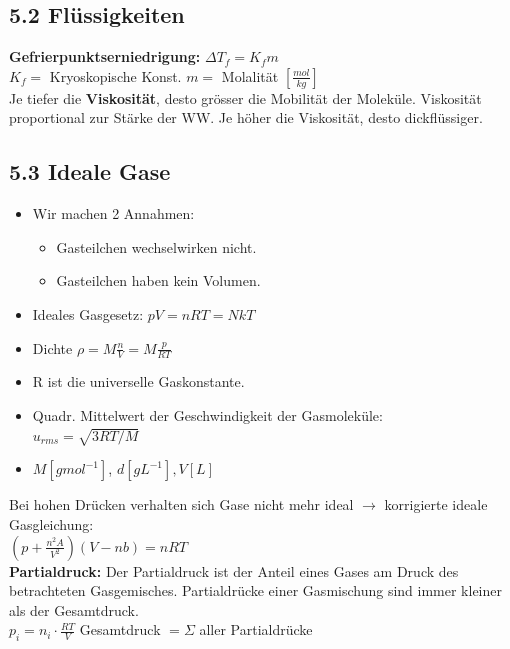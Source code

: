 \begin{multicols*}{4}
\subsection{5.2 Flüssigkeiten}{
    \textbf{Gefrierpunktserniedrigung: } $\Delta T_f=K_fm$\\
    $K_f=$ Kryoskopische Konst.     $m=$ Molalität $\left[\frac{mol}{kg}\right]$\\
    Je tiefer die \textbf{Viskosität}, desto grösser die Mobilität der Moleküle. Viskosität proportional
    zur Stärke der WW. Je höher die Viskosität, desto dickflüssiger. 
}

\cb
\subsection{5.3 Ideale Gase}{
    \begin{itemize}[noitemsep, leftmargin=*]
        \item Wir machen 2 Annahmen:
        \begin{itemize}[noitemsep, leftmargin=*]
            \item Gasteilchen wechselwirken nicht.
            \item Gasteilchen haben kein Volumen.
        \end{itemize}
        \item Ideales Gasgesetz: $pV = nRT=N kT$
        \item Dichte $\rho = M\frac{n}{V}=M\frac{p}{RT}$
        \item R ist die universelle Gaskonstante.\vspace*{1mm}
        \item Quadr. Mittelwert der Geschwindigkeit der Gasmoleküle:\\ $u_{rms}=\sqrt{3RT/M}$
        \item $M\left[ gmol^{-1} \right]$, $d\left[ gL^{-1} \right], V\left[L\right]$
    \end{itemize}
    \vspace{1mm}
    Bei hohen Drücken verhalten sich Gase nicht mehr ideal $\rightarrow$  korrigierte
    ideale Gasgleichung:\\\quad\quad$(p+\frac{n^2A}{V^2})(V-nb)=nRT$\\
\textbf{Partialdruck:} Der Partialdruck ist der Anteil eines Gases am Druck des betrachteten Gasgemisches. Partialdrücke einer Gasmischung sind immer kleiner als der Gesamtdruck.\vspace{0.5mm}\\
$p_i=n_i\cdot\frac{RT}{V}$ Gesamtdruck $=\Sigma$ aller Partialdrücke
}



\end{multicols*}

